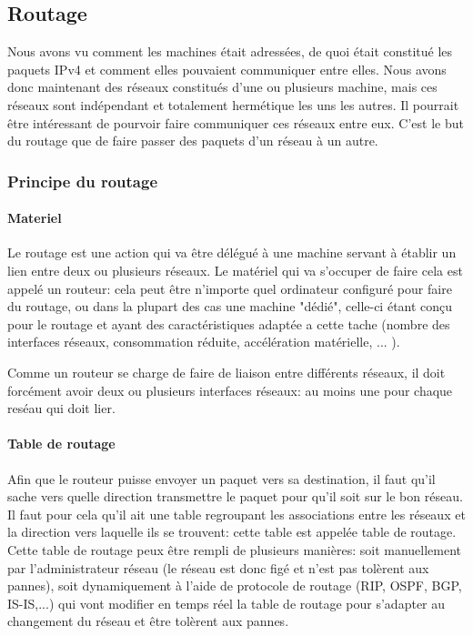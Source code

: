 \subsection{Routage}

Nous avons vu comment les machines était adressées, de quoi était constitué les
paquets IPv4 et comment elles pouvaient communiquer entre elles.  Nous avons
donc maintenant des réseaux constitués d'une ou plusieurs machine, mais ces
réseaux sont indépendant et totalement hermétique les uns les autres. Il
pourrait être intéressant de pourvoir faire communiquer ces réseaux entre eux.
C'est le but du routage que de faire passer des paquets d'un réseau à un autre.

\subsubsection{Principe du routage}

\paragraph{Materiel}
Le routage est une action qui va être délégué à une machine servant à établir
un lien entre deux ou plusieurs réseaux.  Le matériel qui va s'occuper de faire
cela est appelé un routeur: cela peut être n'importe quel ordinateur configuré
pour faire du routage, ou dans la plupart des cas une machine "dédié", celle-ci
étant conçu pour le routage et ayant des caractéristiques adaptée a cette tache
(nombre des interfaces réseaux, consommation réduite, accélération matérielle, ... ).

Comme un routeur se charge de faire de liaison entre différents réseaux, il doit
forcément avoir deux ou plusieurs interfaces réseaux: au moins une pour chaque
reséau qui doit lier.

\paragraph{Table de routage}
Afin que le routeur puisse envoyer un paquet vers sa destination, il faut qu'il
sache vers quelle direction transmettre le paquet pour qu'il soit sur le bon
réseau. Il faut pour cela qu'il ait une table regroupant les associations entre
les réseaux et la direction vers laquelle ils se trouvent: cette table est
appelée table de routage.  Cette table de routage peux être rempli de plusieurs
manières: soit manuellement par l'administrateur réseau (le réseau est donc
figé et n'est pas tolèrent aux pannes), soit dynamiquement à l'aide de
protocole de routage (RIP, OSPF, BGP, IS-IS,...) qui vont modifier en temps
réel la table de routage pour s'adapter au changement du réseau et être
tolèrent aux pannes.

